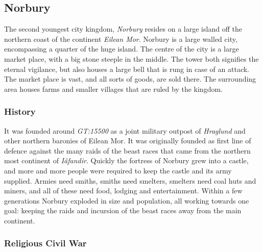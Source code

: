 \subsection*{Norbury}


The second youngest city kingdom, \emph{Norbury} resides on a large island off
the northern coast of the continent \emph{Eilean Mor}. Norbury is a large
walled city, encompassing a quarter of the huge island. The centre of the city
is a large market place, with a big stone steeple in the middle. The tower both
signifies the eternal vigilance, but also houses a large bell that is rung in
case of an attack. The market place is vast, and all sorts of goods, are sold
there. The surrounding area houses farms and smaller villages that are ruled
by the kingdom.

\subsubsection*{History}

It was founded around \emph{GT:15500} as a joint military outpost of
\emph{Hraglund} and other northern baronies of Eilean Mor. It was originally
founded as first line of defence against the many raids of the beast races
that came from the northern most continent of \emph{Iâfandir}. Quickly the
fortress of Norbury grew into a castle, and more and more people were
required to keep the castle and its army supplied. Armies need smiths,
smiths need smelters, smelters need coal huts and miners, and all of
these need food, lodging and entertainment. Within a few generations
Norbury exploded in size and population, all working towards one goal:
keeping the raids and incursion of the beast races away from the main
continent.

\subsubsection*{Religious Civil War}

